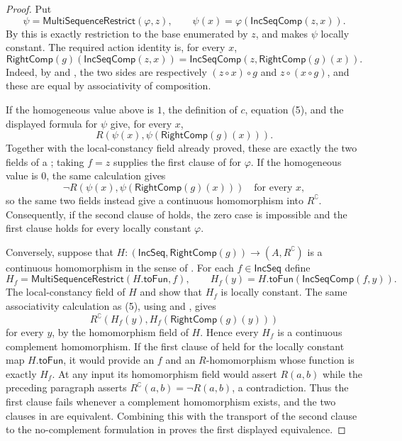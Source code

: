 \begin{proof}
Put
\[
\psi=\mathsf{MultiSequenceRestrict}(\varphi,z),
\qquad
\psi(x)=\varphi(\mathsf{IncSeqComp}(z,x)).
\]
By  this is exactly restriction to the base
enumerated by $z$, and  makes $\psi$
locally constant.  The required action identity is, for every $x$,
\[
\mathsf{RightComp}(g)(\mathsf{IncSeqComp}(z,x))
 =\mathsf{IncSeqComp}(z,\mathsf{RightComp}(g)(x)). \tag{5}
\]
Indeed, by  and , the two sides are
respectively $(z\circ x)\circ g$ and $z\circ(x\circ g)$, and these are
equal by associativity of composition.

If the homogeneous value above is $1$, the definition of $c$, equation
(5), and the displayed formula for $\psi$ give, for every $x$,
\[
R(\psi(x),\psi(\mathsf{RightComp}(g)(x))).
\]
Together with the local-constancy field already proved, these are exactly
the two fields of a ; taking $f=z$ supplies the
first clause of  for $\varphi$.  If the homogeneous value
is $0$, the same calculation gives
\[
\neg R(\psi(x),\psi(\mathsf{RightComp}(g)(x)))
\quad\text{for every }x,
\]
so the same two fields instead give a continuous homomorphism into
$R^{\complement}$.  Consequently, if the second clause of
 holds, the zero case is impossible and the first clause
holds for every locally constant $\varphi$.

Conversely, suppose that
$H:(\mathsf{IncSeq},\mathsf{RightComp}(g))\to(A,R^{\complement})$ is a
continuous homomorphism in the sense of .  For
each $f\in\mathsf{IncSeq}$ define
\[
H_f=\mathsf{MultiSequenceRestrict}(H.\mathsf{toFun},f),
\qquad H_f(y)=H.\mathsf{toFun}(\mathsf{IncSeqComp}(f,y)).
\]
The local-constancy field of $H$ and
 show that $H_f$ is locally constant.
The same associativity calculation as (5), using
 and , gives
\[
R^{\complement}(H_f(y),H_f(\mathsf{RightComp}(g)(y)))
\]
for every $y$, by the homomorphism field of $H$.  Hence every $H_f$ is a
continuous complement homomorphism.  If the first clause of
 held for the locally constant map $H.\mathsf{toFun}$,
it would provide an $f$ and an $R$-homomorphism whose function is exactly
$H_f$.  At any input its homomorphism field would assert $R(a,b)$ while the
preceding paragraph asserts $R^{\complement}(a,b)=\neg R(a,b)$, a
contradiction.  Thus the first clause fails whenever a complement
homomorphism exists, and the two clauses in  are
equivalent.  Combining this with the transport of the second clause to the
no-complement formulation in  proves the first displayed
equivalence.


\end{proof}
